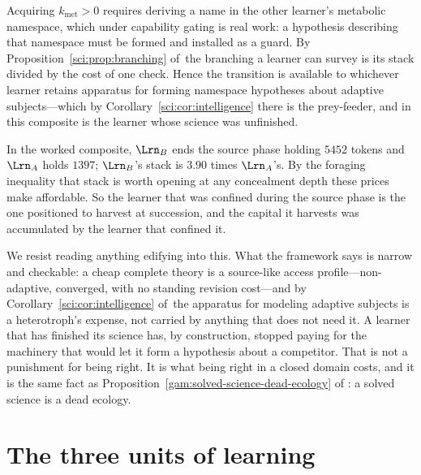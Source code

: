 \begin{corollary}\label{com:change-priced-priced-asymmetrically}
Acquiring $k_{\mathrm{met}} > 0$ requires deriving a name in the other learner's metabolic
namespace, which under capability gating is real work: a hypothesis describing that namespace
must be formed and installed as a guard. By Proposition~\ref{sci:prop:branching} of~\chSci the branching a
learner can survey is its stack divided by the cost of one check. Hence the transition is
available to whichever learner retains apparatus for forming namespace hypotheses about adaptive
subjects---which by Corollary~\ref{sci:cor:intelligence} there is the prey-feeder, and in this composite is the learner
whose science was unfinished.
\end{corollary}

In the worked composite, $\Lrn_B$ ends the source phase holding $5452$ tokens and $\Lrn_A$ holds
$1397$; $\Lrn_B$'s stack is $3.90$ times $\Lrn_A$'s. By the foraging inequality that stack is
worth opening at any concealment depth these prices make affordable. So the learner that was
confined during the source phase is the one positioned to harvest at succession, and the capital
it harvests was accumulated by the learner that confined it.

\begin{remark}\label{com:offered-as-structure-moral}
We resist reading anything edifying into this. What the framework says is narrow and checkable:
a cheap complete theory is a source-like access profile---non-adaptive, converged, with no
standing revision cost---and by Corollary~\ref{sci:cor:intelligence} of~\chSci the apparatus for modeling
adaptive subjects is a heterotroph's expense, not carried by anything that does not need it. A
learner that has finished its science has, by construction, stopped paying for the machinery that
would let it form a hypothesis about a competitor. That is not a punishment for being right. It
is what being right in a closed domain costs, and it is the same fact as Proposition~\ref{gam:solved-science-dead-ecology} of
\chGame: a solved science is a dead ecology.
\end{remark}

\section{The three units of learning}\label{com:sec:units}\label{com:S12}

